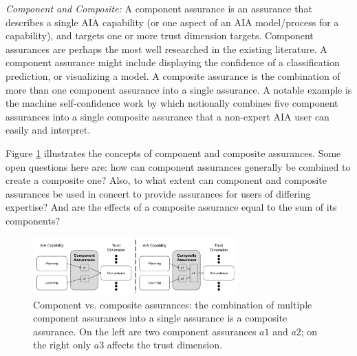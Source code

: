 \emph{Component and Composite:}
A component assurance is an assurance that describes a single AIA capability (or one aspect of an AIA model/process for a capability), and targets one or more trust dimension targets.  Component assurances are perhaps the most well researched in the existing literature. A component assurance might include displaying the confidence of a classification prediction, or visualizing a model. A composite assurance is the combination of more than one component assurance into a single assurance. 
A notable example is the machine self-confidence work by \citet{Aitken2016-cv} which notionally combines five component assurances into a single composite assurance that a non-expert AIA user can easily and interpret. 

Figure \ref{fig:assurance_mapping} illustrates the concepts of component and composite assurances. Some open questions here are: how can component assurances generally be combined to create a composite one? Also, to what extent can component and composite assurances be used in concert to provide assurances for users of differing expertise? And are the effects of a composite assurance equal to the sum of its components?

\begin{figure}[!htbp]
    \centering
    \includegraphics[width=0.7\textwidth]{Figures/Assurance_component_composite.pdf}
    \caption{%
    Component vs. composite assurances: the combination of multiple component assurances into a single assurance is a composite assurance. On the left are two component assurances $a1$ and $a2$; on the right only $a3$ affects the trust dimension.}
    \label{fig:assurance_mapping}
\end{figure}
